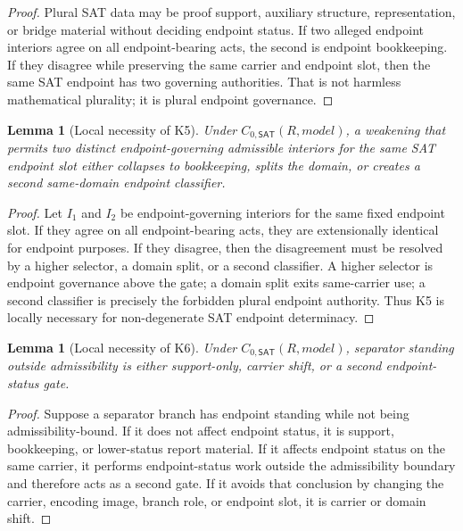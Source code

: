 \documentclass[11pt]{article}
\newtheorem{lemma}[theorem]{Lemma}
\theoremstyle{definition}
\theoremstyle{remark}
\newcommand{\CoreSAT}{C_{0,\mathsf{SAT}}}
\begin{document}
\begin{proof}
Plural SAT data may be proof support, auxiliary structure, representation, or bridge material without deciding endpoint status. If two alleged endpoint interiors agree on all endpoint-bearing acts, the second is endpoint bookkeeping. If they disagree while preserving the same carrier and endpoint slot, then the same SAT endpoint has two governing authorities. That is not harmless mathematical plurality; it is plural endpoint governance.
\end{proof}

\begin{lemma}[Local necessity of K5]\label{lem:sat-k5-necessity}
Under \(\CoreSAT(R,model)\), a weakening that permits two distinct endpoint-governing admissible interiors for the same SAT endpoint slot either collapses to bookkeeping, splits the domain, or creates a second same-domain endpoint classifier.
\end{lemma}

\begin{proof}
Let \(I_1\) and \(I_2\) be endpoint-governing interiors for the same fixed endpoint slot. If they agree on all endpoint-bearing acts, they are extensionally identical for endpoint purposes. If they disagree, then the disagreement must be resolved by a higher selector, a domain split, or a second classifier. A higher selector is endpoint governance above the gate; a domain split exits same-carrier use; a second classifier is precisely the forbidden plural endpoint authority. Thus K5 is locally necessary for non-degenerate SAT endpoint determinacy.
\end{proof}

\begin{lemma}[Local necessity of K6]\label{lem:sat-k6-necessity}
Under \(\CoreSAT(R,model)\), separator standing outside admissibility is either support-only, carrier shift, or a second endpoint-status gate.
\end{lemma}

\begin{proof}
Suppose a separator branch has endpoint standing while not being admissibility-bound. If it does not affect endpoint status, it is support, bookkeeping, or lower-status report material. If it affects endpoint status on the same carrier, it performs endpoint-status work outside the admissibility boundary and therefore acts as a second gate. If it avoids that conclusion by changing the carrier, encoding image, branch role, or endpoint slot, it is carrier or domain shift.
\end{proof}
\end{document}

